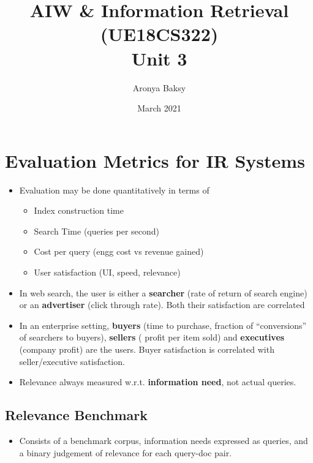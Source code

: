 \documentclass{article}
\title{AIW \& Information Retrieval (UE18CS322)\\Unit 3}
\author{Aronya Baksy}
\date{March 2021}
\begin{document}
\maketitle
\section{Evaluation Metrics for IR Systems}
\begin{itemize}
    \item Evaluation may be done quantitatively in terms of
    \begin{itemize}
        \item Index construction time
        
        \item Search Time (queries per second)
        
        \item Cost per query (engg cost vs revenue gained)
        
        \item User satisfaction (UI, speed, relevance)
    \end{itemize}
    
    \item In web search, the user is either a \textbf{searcher} (rate of return of search engine) or an \textbf{advertiser} (click through rate). Both their satisfaction are correlated
    
    \item In an enterprise setting, \textbf{buyers} (time to purchase, fraction of “conversions” of searchers to buyers), \textbf{sellers} ( profit per item sold) and \textbf{executives} (company profit) are the users. Buyer satisfaction is correlated with seller/executive satisfaction. 
    
    \item Relevance always measured w.r.t. \textbf{information need}, not actual queries. 
\end{itemize}

\subsection{Relevance Benchmark}
\begin{itemize}
    \item Consists of a benchmark corpus, information needs expressed as queries, and a binary judgement of relevance for each query-doc pair.
\end{itemize}
\end{document}
